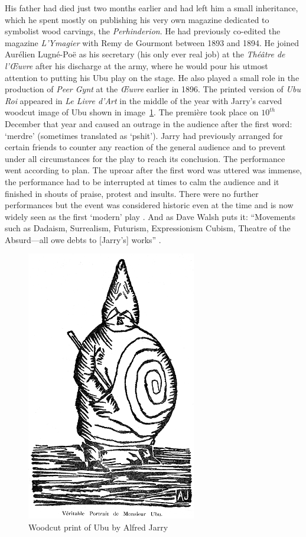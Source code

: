 His father had died just two months earlier and had left him a small inheritance, which he spent mostly on publishing his very own magazine dedicated to symbolist wood carvings, the \textit{Perhinderion}. He had previously co-edited the magazine \textit{L'Ymagier} with Remy de Gourmont between 1893 and 1894. He joined Aurélien Lugné-Poë as his secretary (his only ever real job) at the \textit{Théâtre de l'Œuvre} after his discharge at the army, where he would pour his utmost attention to putting his Ubu play on the stage. He also played a small role in the production of \textit{Peer Gynt} at the \textit{Œuvre} earlier in 1896. The printed version of \textit{Ubu Roi} appeared in \textit{Le Livre d'Art} in the middle of the year with Jarry's carved woodcut image of Ubu shown in image~\ref{img:UBU}. The première took place on $10^{th}$ December that year and caused an outrage in the audience after the first word: `merdre' (sometimes translated as `pshit'). Jarry had previously arranged for certain friends to counter any reaction of the general audience and to prevent under all circumstances for the play to reach its conclusion. The performance went according to plan. The uproar after the first word was uttered was immense, the performance had to be interrupted at times to calm the audience and it finished in shouts of praise, protest and insults. There were no further performances but the event was considered historic even at the time and is now widely seen as the first `modern' play \autocite{Brotchie2011a}. And as Dave Walsh puts it: ``Movements such as Dadaism, Surrealism, Futurism, Expressionism Cubism, Theatre of the Absurd---all owe debts to [Jarry's] works'' \autocite*{Walsh2001}.

\begin{figure}[!htbp] %
  \centering
  \includegraphics[height=0.3\textheight]{images/ubu}
  \caption[Woodcut print of Ubu]{Woodcut print of Ubu by Alfred Jarry}
\label{img:UBU}
\end{figure}

